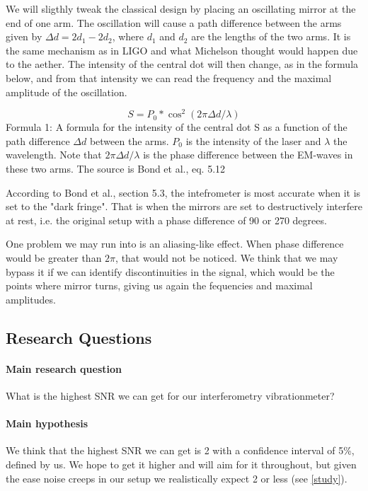 \documentclass[a4paper,11pt]{article} %
\begin{document}
We will sligthly tweak the classical design by placing an oscillating mirror at the end of one arm. The oscillation will cause a path difference between the arms given by $\Delta d = 2d_{1} - 2d_{2}$, where $d_1$ and $d_2$ are the lengths of the two arms. It is the same mechanism as in LIGO and what Michelson thought would happen due to the aether. The intensity of the central dot will then change, as in the formula below, and from that intensity we can read the frequency and the maximal amplitude of the oscillation.

\begin{equation}
S = P_0 * \cos^2(2\pi \Delta d/\lambda)
\end{equation}
Formula 1: A formula for the intensity of the central dot S as a function of the path difference $\Delta d$ between the arms. $P_0$ is the intensity of the laser and $\lambda$ the wavelength. Note that $2\pi \Delta d/\lambda$ is the phase difference between the EM-waves in these two arms. The source is Bond et al., eq. 5.12 \cite{Review} 

According to Bond et al., section 5.3\cite{Review}, the intefrometer is most accurate when it is set to the "dark fringe". That is when the mirrors are set to destructively interfere at rest, i.e. the original setup with a phase difference of 90 or 270 degrees.

One problem we may run into is an aliasing-like effect. When phase difference would be greater than $2\pi$, that would not be noticed. We think that we may bypass it if we can identify discontinuities in the signal, which would be the points where mirror turns, giving us again the fequencies and maximal amplitudes.



\subsection{Research Questions}
\paragraph{Main research question} What is the highest SNR we can get for our interferometry vibrationmeter? 

\paragraph{Main hypothesis} We think that the highest SNR we can get is 2 with a confidence interval of 5\%, defined by us. We hope to get it higher and will aim for it throughout, but given the ease noise creeps in our setup we realistically expect 2 or less (see \ref{study}).
\end{document}
